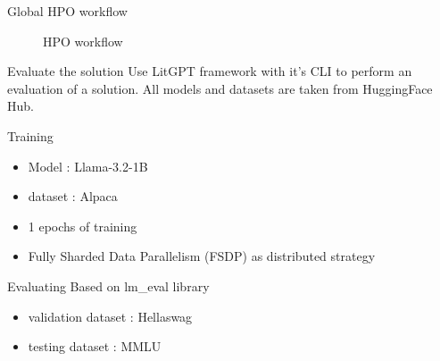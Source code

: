 \begin{frame}{Global HPO workflow}
            \begin{figure}
                \centering
                
                \caption{HPO workflow}
            \end{figure}
    
\end{frame}

\begin{frame}{Evaluate the solution}
    Use LitGPT framework with it's CLI to perform an evaluation of a solution. All models and datasets are taken from HuggingFace Hub.
    \begin{block}{Training}
        \begin{itemize}
            \item Model : Llama-3.2-1B
            \item dataset : Alpaca
            \item 1 epochs of training
            \item Fully Sharded Data Parallelism (FSDP) as distributed strategy
        \end{itemize}
    \end{block}

    \begin{block}{Evaluating}
        Based on lm\_eval library
        \begin{itemize}
            \item validation dataset : Hellaswag
            \item testing dataset : MMLU
        \end{itemize}
    \end{block}

    
\end{frame}

